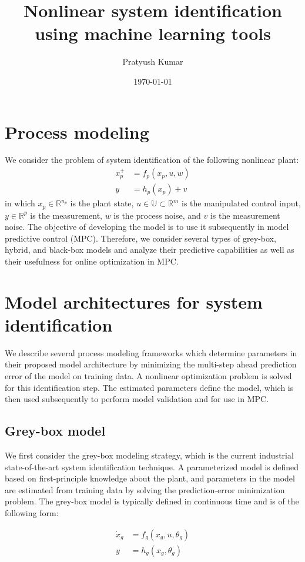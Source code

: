 \documentclass[10pt]{article}
\title{Nonlinear system identification using machine learning tools}
\author{Pratyush Kumar}
\date{\today}
\newcommand{\bbR}{\mathbb{R}} \newcommand{\bbW}{\mathbb{W}}
\newcommand{\bbU}{\mathbb{U}} \newcommand{\bbI}{\mathbb{I}}
\begin{document}
\maketitle

\section{Process modeling}
We consider the problem of system identification of the following nonlinear plant:
\begin{align*}
  x_p^+ &= f_p(x_p, u, w) \\
  y &= h_p(x_p) + v
\end{align*}
in which $x_p \in \bbR^{n_p}$ is the plant state, $u \in \bbU \subset \bbR^m$ is the
manipulated control input, $y \in \bbR^p$ is the measurement, $w$ is the process
noise, and $v$ is the measurement noise. The objective of developing the model is to use it subsequently in model predictive control (MPC). Therefore, we consider several types of grey-box, hybrid, and black-box models and analyze their predictive capabilities as well as their usefulness for online optimization in MPC. 

\section{Model architectures for system identification}
We describe several process modeling frameworks which determine parameters in their proposed model architecture by minimizing the multi-step ahead prediction error of the model on training data. A nonlinear optimization problem is solved for this identification step. The estimated parameters define the model, which is then used subsequently to perform model validation and for use in MPC.

\subsection{Grey-box model}
We first consider the grey-box modeling strategy, which is the current industrial state-of-the-art system identification technique. A parameterized model is defined based on first-principle knowledge about the plant, and parameters in the model are estimated from training data by solving the prediction-error minimization problem. The grey-box model is typically defined in continuous time and is of the following form:

\begin{align*}
  \dot{x}_g &= f_g(x_g, u, \theta_g) \\
  y &= h_g(x_g, \theta_g)
\end{align*}
\end{document}
